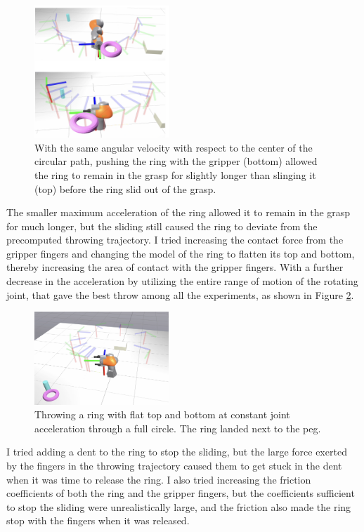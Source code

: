 \documentclass[conference]{IEEEtran}
\begin{document}
\begin{figure}[ht]
\centering
\includegraphics[width=0.45\textwidth]{images/forward_onward.png}
\caption{With the same angular velocity with respect to the center of the circular path, pushing the ring with the gripper (bottom) allowed the ring to remain in the grasp for slightly longer than slinging it (top) before the ring slid out of the grasp.}
\label{fig:forward_onward}
\end{figure}

The smaller maximum acceleration of the ring allowed it to remain in the grasp for much longer, but the sliding still caused the ring to deviate from the precomputed throwing trajectory. I tried increasing the contact force from the gripper fingers and changing the model of the ring to flatten its top and bottom, thereby increasing the area of contact with the gripper fingers. With a further decrease in the acceleration by utilizing the entire range of motion of the rotating joint, that gave the best throw among all the experiments, as shown in Figure \ref{fig:full_circle}.

\begin{figure}[ht]
\centering
\includegraphics[width=0.45\textwidth]{images/full_circle.png}
\caption{Throwing a ring with flat top and bottom at constant joint acceleration through a full circle. The ring landed next to the peg.}
\label{fig:full_circle}
\end{figure}

I tried adding a dent to the ring to stop the sliding, but the large force exerted by the fingers in the throwing trajectory caused them to get stuck in the dent when it was time to release the ring. I also tried increasing the friction coefficients of both the ring and the gripper fingers, but the coefficients sufficient to stop the sliding were unrealistically large, and the friction also made the ring stop with the fingers when it was released.
\end{document}
